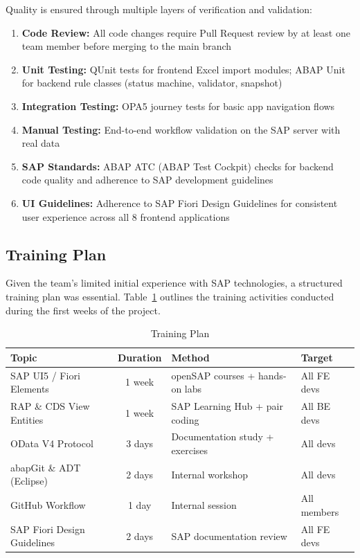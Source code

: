 \documentclass[12pt,a4paper]{report}
\begin{document}
Quality is ensured through multiple layers of verification and validation:
\begin{enumerate}[leftmargin=2em]
  \item \textbf{Code Review:} All code changes require Pull Request review by at least one team member before merging to the main branch
  \item \textbf{Unit Testing:} QUnit tests for frontend Excel import modules; ABAP Unit for backend rule classes (status machine, validator, snapshot)
  \item \textbf{Integration Testing:} OPA5 journey tests for basic app navigation flows
  \item \textbf{Manual Testing:} End-to-end workflow validation on the SAP server with real data
  \item \textbf{SAP Standards:} ABAP ATC (ABAP Test Cockpit) checks for backend code quality and adherence to SAP development guidelines
  \item \textbf{UI Guidelines:} Adherence to SAP Fiori Design Guidelines for consistent user experience across all 8 frontend applications
\end{enumerate}

\subsection{Training Plan}

Given the team's limited initial experience with SAP technologies, a structured training plan was essential. Table~\ref{tab:training} outlines the training activities conducted during the first weeks of the project.

\begin{table}[H]
\centering\small
\begin{tabularx}{\textwidth}{|X|c|X|l|}
  \hline
  \rowcolor{tableheadpeach}
  \textbf{Topic} & \textbf{Duration} & \textbf{Method} & \textbf{Target} \\ \hline
  SAP UI5 / Fiori Elements       & 1 week & openSAP courses + hands-on labs     & All FE devs \\ \hline
  RAP \& CDS View Entities       & 1 week & SAP Learning Hub + pair coding      & All BE devs \\ \hline
  OData V4 Protocol              & 3 days & Documentation study + exercises     & All devs \\ \hline
  abapGit \& ADT (Eclipse)       & 2 days & Internal workshop                   & All devs \\ \hline
  GitHub Workflow                 & 1 day  & Internal session                    & All members \\ \hline
  SAP Fiori Design Guidelines    & 2 days & SAP documentation review            & All FE devs \\ \hline
\end{tabularx}
\caption{Training Plan}
\label{tab:training}
\end{table}
\end{document}
